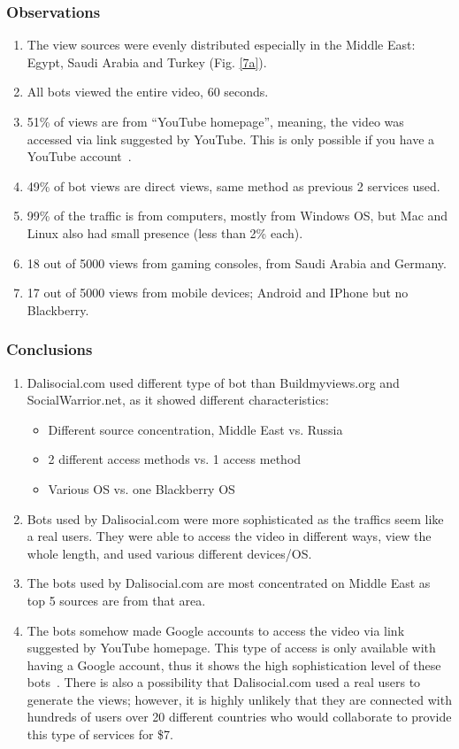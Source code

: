\documentclass[conference]{IEEEtran}
\begin{document}
\subsubsection*{Observations}

\begin{enumerate}
  \item The view sources were evenly distributed especially in the Middle East: Egypt, Saudi Arabia and Turkey (Fig. \ref{7a}).
  \item All bots viewed the entire video, 60 seconds.
  \item 51\% of views are from “YouTube homepage”, meaning, the video was accessed via link suggested by YouTube.  This is only possible if you have a YouTube account~\cite{c21}.
  \item 49\% of bot views are direct views, same method as previous 2 services used.
  \item 99\% of the traffic is from computers, mostly from Windows OS, but Mac and Linux also had small presence (less than 2\% each).
  \item 18 out of 5000 views from gaming consoles, from Saudi Arabia and Germany.
  \item 17 out of 5000 views from mobile devices; Android and IPhone but no Blackberry.
\end{enumerate}

\subsubsection*{Conclusions}

\begin{enumerate}
  \item Dalisocial.com used different type of bot than Buildmyviews.org and SocialWarrior.net, as it showed different characteristics:
  \begin{itemize}
    \item Different source concentration, Middle East vs. Russia
    \item 2 different access methods vs. 1 access method
    \item Various OS vs. one Blackberry OS
  \end{itemize}
  \item Bots used by Dalisocial.com were more sophisticated as the traffics seem like a real users. They were able to access the video in different ways, view the whole length, and used various different devices/OS.
  \item The bots used by Dalisocial.com are most concentrated on Middle East as top 5 sources are from that area.
  \item The bots somehow made Google accounts to access the video via link suggested by YouTube homepage. This type of access is only available with having a Google account, thus it shows the high sophistication level of these bots~\cite{c21}. There is also a possibility that Dalisocial.com used a real users to generate the views; however, it is highly unlikely that they are connected with hundreds of users over 20 different countries who would collaborate to provide this type of services for \$7.
\end{enumerate}
\end{document}
